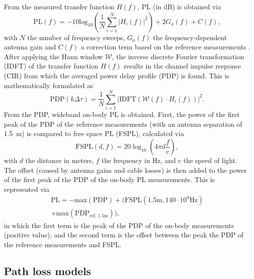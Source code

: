 \documentclass[manuscript]{rsl}
\begin{document}
From the measured transfer function $H(f)$, PL (in dB) is obtained via
\begin{equation}
\label{eq:PL}
\text{PL}(f)= -10 \text{log}_{10} \left( \frac{1}{N} \sum_{i=1}^N | H_i(f) |^2 \right) + 2 G_a(f) + C(f), 
\end{equation}
with $N$ the number of frequency sweeps, $G_a(f)$ the frequency-dependent antenna gain and $C(f)$ a correction term based on the reference measurements \cite{DeBeelde2021_eucap}.
After applying the Hann window $\mathcal{W}$, the inverse discrete Fourier transformation (IDFT) of the transfer function $H(f)$ results in the channel impulse response (CIR) from which the averaged power delay profile (PDP) is found. 
This is mathematically formulated as
\begin{equation}
\text{PDP}(k\Delta\tau) = \frac{1}{N} \sum_{i=1}^N | \text{IDFT}(\mathcal{W}(f) \cdot H_i(f)) |^2.
\label{eq:PDP}
\end{equation}
From the PDP, wideband on-body PL is obtained. 
First, the power of the first peak of the PDP of the reference measurements (with an antenna separation of 1.5~m) is compared to free space PL (FSPL), calculated via 
\begin{equation}
\text{FSPL}(d,f)= 20 \log_{10} \left( 4 \pi d \frac{f}{\text{c}}\right), 
\label{eq:FSPL}
\end{equation}
with $d$ the distance in meters, $f$ the frequency in Hz, and c the speed of light. 
The offset (caused by antenna gains and cable losses) is then added to the power of the first peak of the PDP of the on-body PL measurements. 
This is represented via
\begin{multline}
\text{PL} = - \text{max}(\text{PDP})  + (\text{FSPL}(1.5 \text{m}, 140\cdot10^9 \text{Hz}) \\ + \text{max}(\text{PDP}_\text{ref, 1.5m}) ),
\label{eq:WB-PL}
\end{multline}
in which the first term is the peak of the PDP of the on-body measurements (positive value), and the second term is the offset between the peak the PDP of the reference measurements and FSPL.

\subsection{Path loss models}
\end{document}

